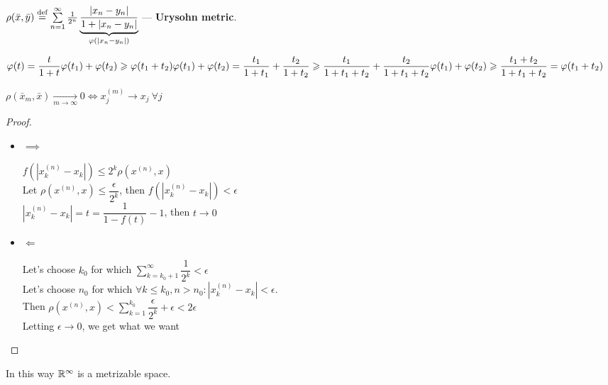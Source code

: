 \begin{defn}
  $\rho(\bar{x}, \bar{y}) \defeq \sum\limits_{n = 1}^\infty \frac{1}{2^n}\underbrace{\frac{|x_n - y_n|}{1 + |x_n - y_n|}}_{\phi(|x_n - y_n|)}$
  --- \textbf{Urysohn metric}.

  \noindent
  \begin{minipage}{.65\linewidth}
    $\displaystyle\phi(t) = \frac{t}{1 + t} \\ \\
    \phi(t_1) + \phi(t_2) \geq \phi(t_1 + t_2) \\ \\
    \phi(t_1) + \phi(t_2) = \frac{t_1}{1 + t_1} + \frac{t_2}{1 + t_2} \geq \frac{t_1}{1 + t_1 + t_2} + \frac{t_2}{1 + t_1 + t_2} \\ \\
    \phi(t_1) + \phi(t_2) \geq \frac{t_1 + t_2}{1 + t_1 + t_2} = \phi(t_1 + t_2)$
  \end{minipage}%
  \begin{minipage}{.35\linewidth}
  \end{minipage}
  \begin{stm}
      $\rho(\bar{x}_m, \bar{x}) \xrightarrow[m \to \infty]{} 0 \iff x_j^{(m)} \to x_j\ \forall j$
  \end{stm}
  \begin{proof}\leavevmode
    \begin{itemize}
      \item $\implies$

      $f(|x^{(n)}_k - x_k|) \leq 2^k \rho(x^{(n)}, x)$ \\
      Let $\rho(x^{(n)}, x) \le \dfrac{\epsilon}{2^k}$, then $f(|x^{(n)}_k - x_k|) < \epsilon$ \\
      $|x^{(n)}_k - x_k| = t = \dfrac{1}{1 - f(t)} - 1$, then $t \to 0$
      \item $\Leftarrow$

      Let's choose $k_0$ for which $\sum\limits_{k=k_0+1}^{\infty} \dfrac{1}{2^k} < \epsilon$ \\
      Let's choose $n_0$ for which $\forall k \leq k_0, n > n_0: |x_k^{(n)} - x_k| < \epsilon$. \\ 
      Then $\rho(x^{(n)}, x) < \sum\limits_{k=1}^{k_0} \dfrac{\epsilon}{2^k} + \epsilon < 2 \epsilon$ \\
      Letting  $\epsilon \to 0$, we get what we want \qedhere
    \end{itemize}
  \end{proof}
  In this way $\R^\infty$ is a metrizable space.
\end{defn}
